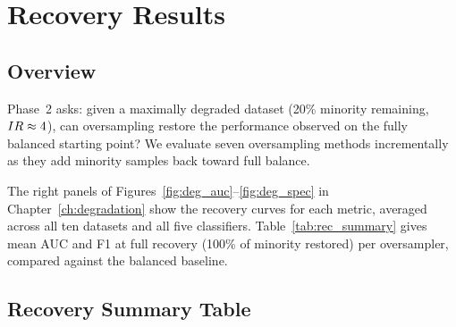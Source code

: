 
\chapter{Recovery Results}
\label{ch:recovery}

\section{Overview}
\label{sec:rec:overview}

Phase~2 asks: given a maximally degraded dataset (20\% minority remaining, $IR \approx 4$), can oversampling restore the performance observed on the fully balanced starting point?
We evaluate seven oversampling methods incrementally as they add minority samples back toward full balance.

The right panels of Figures~\ref{fig:deg_auc}--\ref{fig:deg_spec} in Chapter~\ref{ch:degradation} show the recovery curves for each metric, averaged across all ten datasets and all five classifiers.
Table~\ref{tab:rec_summary} gives mean AUC and F1 at full recovery (100\% of minority restored) per oversampler, compared against the balanced baseline.


\section{Recovery Summary Table}
\label{sec:rec:table}

